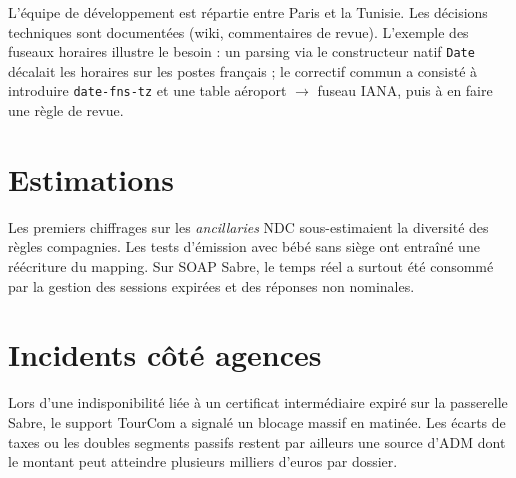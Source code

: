 L'équipe de développement est répartie entre Paris et la Tunisie. Les décisions techniques sont documentées (wiki, commentaires de revue). L'exemple des fuseaux horaires illustre le besoin : un parsing via le constructeur natif \texttt{Date} décalait les horaires sur les postes français ; le correctif commun a consisté à introduire \texttt{date-fns-tz} et une table aéroport $\rightarrow$ fuseau IANA, puis à en faire une règle de revue.

\section{Estimations}

Les premiers chiffrages sur les \textit{ancillaries} NDC sous-estimaient la diversité des règles compagnies. Les tests d'émission avec bébé sans siège ont entraîné une réécriture du mapping. Sur SOAP Sabre, le temps réel a surtout été consommé par la gestion des sessions expirées et des réponses non nominales.

\section{Incidents côté agences}

Lors d'une indisponibilité liée à un certificat intermédiaire expiré sur la passerelle Sabre, le support TourCom a signalé un blocage massif en matinée. Les écarts de taxes ou les doubles segments passifs restent par ailleurs une source d'ADM dont le montant peut atteindre plusieurs milliers d'euros par dossier.
